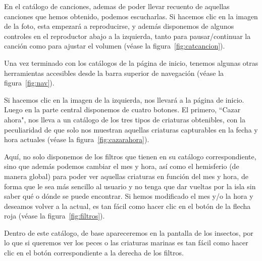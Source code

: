 En el catálogo de canciones, ademas de poder llevar recuento de aquellas canciones que hemos obtenido, podemos escucharlas. Si hacemos clic en la imagen de la foto, esta empezará a reproducirse, y además disponemos de algunos controles en el reproductor abajo a la izquierda, tanto para pausar/continuar la canción como para ajustar el volumen {(v\'ease la figura~\ref{fig:catcancion})}.\\


\clearpage

Una vez terminado con los catálogos de la página de inicio, tenemos algunas otras herramientas accesibles desde la barra superior de navegación {(v\'ease la figura~\ref{fig:nav})}.\\


Si hacemos clic en la imagen de la izquierda, nos llevará a la página de inicio. Luego en la parte central disponemos de cuatro botones. El primero, ``Cazar ahora", nos lleva a un catálogo de los tres tipos de criaturas obtenibles, con la peculiaridad de que solo nos muestran aquellas criaturas capturables en la fecha y hora actuales {(v\'ease la figura~\ref{fig:cazarahora})}.\\


Aquí, no solo disponemos de los filtros que tienen en su catálogo correspondiente, sino que además podemos cambiar el mes y hora, así como el hemisferio (de manera global) para poder ver aquellas criaturas en función del mes y hora, de forma que le sea más sencillo al usuario y no tenga que dar vueltas por la isla sin saber qué o dónde se puede encontrar. Si hemos modificado el mes y/o la hora y deseamos volver a la actual, es tan fácil como hacer clic en el botón de la flecha roja {(v\'ease la figura~\ref{fig:filtros})}.\\


Dentro de este catálogo, de base apareceremos en la pantalla de los insectos, por lo que si queremos ver los peces o las criaturas marinas es tan fácil como hacer clic en el botón correspondiente a la derecha de los filtros.\\

